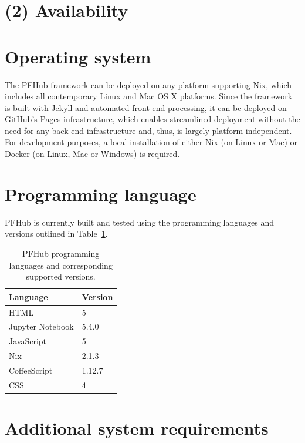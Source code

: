 \documentclass{jors}
\begin{document}
\section*{(2) Availability}
\vspace{0.5cm}
\section*{Operating system}

The PFHub framework can be deployed on any platform supporting Nix,
which includes all contemporary Linux and Mac OS X platforms. Since
the framework is built with Jekyll and automated front-end processing,
it can be deployed on GitHub's Pages infrastructure, which enables
streamlined deployment without the need for any back-end
infrastructure and, thus, is largely platform independent. For
development purposes, a local installation of either Nix (on Linux or
Mac) or Docker (on Linux, Mac or Windows) is required.

\section*{Programming language}

PFHub is currently built and tested using the programming languages
and versions outlined in Table~\ref{tab:versions}.

\begin{table}[h!]
  \centering
  \caption{PFHub programming languages and corresponding supported
    versions.}
  \begin{tabular}{|l|l|}
    \hline
    Language         & Version \\
    \hline
    HTML             & 5       \\
    Jupyter Notebook & 5.4.0   \\
    JavaScript       & 5       \\
    Nix              & 2.1.3   \\
    CoffeeScript     & 1.12.7  \\
    CSS              & 4       \\
    \hline
  \end{tabular}
  \label{tab:versions}
\end{table}


\section*{Additional system requirements}
\end{document}
